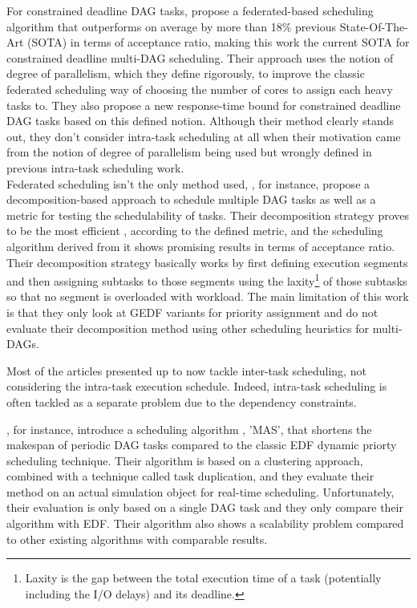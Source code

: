 For constrained deadline DAG tasks, 
\citet{He2023DegreeOfParallelism} propose a federated-based
scheduling algorithm that outperforms on average by more than 18\%
previous State-Of-The-Art\cite{Jiang2023SchedVirtualProcs} (SOTA) in terms of acceptance
ratio, making this work the current SOTA for constrained deadline multi-DAG scheduling.
Their approach uses the notion of degree of parallelism, which they 
define rigorously, to improve the classic federated scheduling way of 
choosing the number of cores to assign each heavy tasks to.
They also propose a new response-time bound for constrained deadline DAG tasks
based on this defined notion.
Although their method clearly stands out,
they don't consider intra-task scheduling at all 
when their motivation came from the notion 
of degree of parallelism being used
but wrongly defined in previous intra-task scheduling work\cite{Zhao2022DAGsched}\cite{zhao2020DAGsched}.\\

Federated scheduling isn't the only method used,
\citet{JiangDecompoSchedParallelTask},
for instance, propose a decomposition-based 
approach to schedule multiple DAG tasks as well as 
a metric for testing the schedulability of tasks.
Their decomposition strategy proves to be the most efficient 
, according to the defined metric, and the scheduling algorithm
derived from it shows promising results in terms of
acceptance ratio.
Their decomposition strategy basically works by first 
defining execution segments and then assigning subtasks 
to those segments using the laxity\footnote{Laxity is the gap between the total execution time of a task (potentially including the I/O delays) and its deadline.} of those subtasks so that 
no segment is overloaded with workload.
The main limitation of this work is that 
they only look at GEDF variants for priority assignment 
and do not evaluate their decomposition method
using other scheduling heuristics for multi-DAGs.

Most of the articles presented up to now 
tackle inter-task scheduling, not considering
the intra-task execution schedule.
Indeed, intra-task scheduling\cite{He2019DagIntra}\cite{Xiao2019}
\cite{Shi2024DagExecGroups}\cite{Zhao2024GATDRLmodel}\cite{Lee2021GlobalDagSchedDRL}
\cite{GuanFRTDS2020RL} is often tackled as a separate
problem due to the dependency constraints.

\citet{Xiao2019}, for instance, introduce a scheduling algorithm 
, 'MAS', that shortens the makespan of periodic DAG tasks
compared to the classic EDF dynamic priorty scheduling technique.
Their algorithm is based on a clustering approach, combined with
a technique called task duplication, and they evaluate their method
on an actual simulation object for real-time scheduling.
Unfortunately, their evaluation is only based on a single DAG task
and they only compare their algorithm with EDF.
Their algorithm also shows a scalability problem compared to 
other existing algorithms with comparable results.

